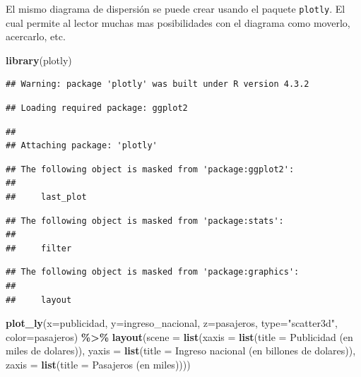 \documentclass[
]{book}
\newenvironment{Shaded}{\begin{snugshade}}{\end{snugshade}}
\newcommand{\AttributeTok}[1]{\textcolor[rgb]{0.13,0.29,0.53}{#1}}
\newcommand{\FunctionTok}[1]{\textcolor[rgb]{0.13,0.29,0.53}{\textbf{#1}}}
\newcommand{\NormalTok}[1]{#1}
\newcommand{\SpecialCharTok}[1]{\textcolor[rgb]{0.81,0.36,0.00}{\textbf{#1}}}
\newcommand{\StringTok}[1]{\textcolor[rgb]{0.31,0.60,0.02}{#1}}
\begin{document}
El mismo diagrama de dispersión se puede crear usando el paquete \texttt{plotly}. El cual permite al lector muchas mas posibilidades con el diagrama como moverlo, acercarlo, etc.

\begin{Shaded}
\begin{Highlighting}[]
\FunctionTok{library}\NormalTok{(plotly)}
\end{Highlighting}
\end{Shaded}

\begin{verbatim}
## Warning: package 'plotly' was built under R version 4.3.2
\end{verbatim}

\begin{verbatim}
## Loading required package: ggplot2
\end{verbatim}

\begin{verbatim}
## 
## Attaching package: 'plotly'
\end{verbatim}

\begin{verbatim}
## The following object is masked from 'package:ggplot2':
## 
##     last_plot
\end{verbatim}

\begin{verbatim}
## The following object is masked from 'package:stats':
## 
##     filter
\end{verbatim}

\begin{verbatim}
## The following object is masked from 'package:graphics':
## 
##     layout
\end{verbatim}

\begin{Shaded}
\begin{Highlighting}[]
\FunctionTok{plot\_ly}\NormalTok{(}\AttributeTok{x=}\NormalTok{publicidad, }\AttributeTok{y=}\NormalTok{ingreso\_nacional, }\AttributeTok{z=}\NormalTok{pasajeros, }\AttributeTok{type=}\StringTok{"scatter3d"}\NormalTok{, }\AttributeTok{color=}\NormalTok{pasajeros) }\SpecialCharTok{\%\textgreater{}\%} 
  \FunctionTok{layout}\NormalTok{(}\AttributeTok{scene =} \FunctionTok{list}\NormalTok{(}\AttributeTok{xaxis =} \FunctionTok{list}\NormalTok{(}\AttributeTok{title =} \StringTok{\textquotesingle{}Publicidad (en miles de dolares)\textquotesingle{}}\NormalTok{),}
                      \AttributeTok{yaxis =} \FunctionTok{list}\NormalTok{(}\AttributeTok{title =} \StringTok{\textquotesingle{}Ingreso nacional (en billones de dolares)\textquotesingle{}}\NormalTok{),}
                      \AttributeTok{zaxis =} \FunctionTok{list}\NormalTok{(}\AttributeTok{title =} \StringTok{\textquotesingle{}Pasajeros (en miles)\textquotesingle{}}\NormalTok{)))}
\end{Highlighting}
\end{Shaded}
\end{document}
